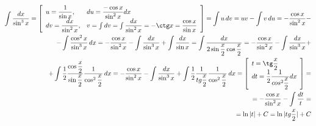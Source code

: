 \begin{eqnarray*}
  \int \dfrac{dx}{\sin^3 x}
  = \begin{bmatrix}
    \begin{array}{ll}
      u = \dfrac{1}{\sin x}, & du = \dfrac{- \cos x}{\sin^{2} x} dx\\
      dv = \dfrac{dx}{\sin^{2} x}, & v = \int dv = \int \dfrac{dx}{\sin^{2} x} = -\ctg x = \dfrac{\cos x}{\sin x}
    \end{array}
  \end{bmatrix}
  = \int u\, dv = uv - \int v\, du
  = -\dfrac{\cos x}{\sin^2 x}
  -\\- \int \dfrac{\cos^2 x}{\sin^3 x}\, dx
  = -\dfrac{\cos x}{\sin^2 x} 
  - \int \dfrac{dx}{\sin^3 x}
  + \int \dfrac{dx}{\sin x}
  = \int \dfrac{dx}{2 \sin\dfrac{x}{2} \cos\dfrac{x}{2}}
  = -\dfrac{\cos x}{\sin^2 x} 
  - \int \dfrac{dx}{\sin^3 x}
  +\\+ \int \dfrac{1}{2}\dfrac{\cos\dfrac{x}{2}}{\sin\dfrac{x}{2}}\dfrac{1}{\cos^2\dfrac{x}{2}}\, dx
  = -\dfrac{\cos x}{\sin^2 x} 
  - \int \dfrac{dx}{\sin^3 x}
  + \int \dfrac{1}{2}\dfrac{1}{tg\dfrac{x}{2}}\dfrac{1}{\cos^2\dfrac{x}{2}}\, dx
  = \begin{bmatrix}
    \begin{array}{l}
      t = \tg\dfrac{x}{2}\\
      dt = \dfrac{1}{2} \dfrac{1}{cos^2\dfrac{x}{2}} dx
    \end{array}
  \end{bmatrix}
  =\\= -\dfrac{\cos x}{\sin^2 x} 
  - \int \dfrac{dt}{t}
  =\\= \ln|t| + C
  = \ln|tg\dfrac{x}{2}| + C
\end{eqnarray*}